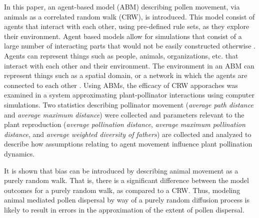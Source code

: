 In this paper, an agent-based model (ABM) describing pollen movement, via animals
as a correlated random walk (CRW), is introduced. This model consist of agents
that interact with each other, using pre-defined rule sets, as they explore their
environment. Agent based models allow for simulations that consist of a large
number of interacting parts that would not be easily constructed otherwise
\cite{Fioretti05}. Agents can represent things such as people, animals,
organizations, etc. that interact with each other and their environment. The
environment in an ABM can represent things such as a spatial domain, or a
network in which the agents are connected to each other \cite{Gilbert}. Using
ABMs, the efficacy of CRW apporaches was examined in a system approximating
plant-pollinator interactions using computer simulations. Two statistics
describing pollinator movement (\emph{average path distance} and \emph{average
maximum distance}) were collected and parameters relevant to the plant
reproduction (\emph{average pollination distance}, \emph{average maximum
pollination distance}, and \emph{average weighted diversity of fathers}) are
collected and analyzed to describe how assumptions relating to agent movement
influence plant pollination dynamics.

It is shown that bias can be introduced by describing animal movement as a
purely random walk. That is, there is a significant difference between the model
outcomes for a purely random walk, as compared to a CRW. Thus, modeling animal
mediated pollen dispersal by way of a purely random diffusion process is likely
to result in errors in the approximation of the extent of pollen dispersal.
